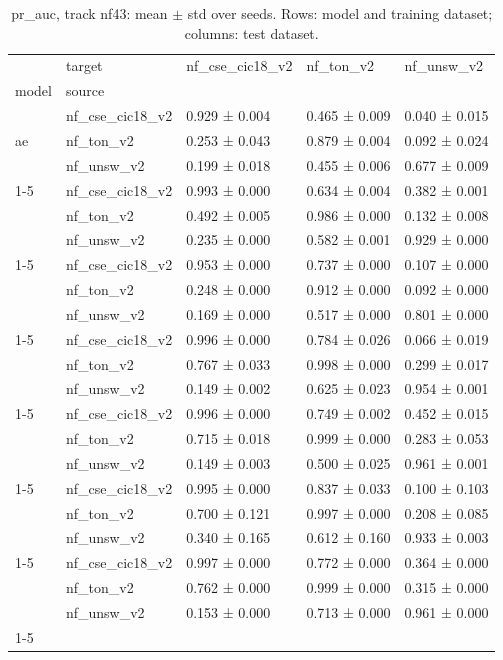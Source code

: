 \begin{table}
\caption{pr_auc, track nf43: mean $\pm$ std over seeds. Rows: model and training dataset; columns: test dataset.}
\label{tab:matrix_nf43_pr_auc}
\begin{tabular}{lllll}
\toprule
 & target & nf_cse_cic18_v2 & nf_ton_v2 & nf_unsw_v2 \\
model & source &  &  &  \\
\midrule
\multirow[t]{3}{*}{ae} & nf_cse_cic18_v2 & 0.929 ± 0.004 & 0.465 ± 0.009 & 0.040 ± 0.015 \\
 & nf_ton_v2 & 0.253 ± 0.043 & 0.879 ± 0.004 & 0.092 ± 0.024 \\
 & nf_unsw_v2 & 0.199 ± 0.018 & 0.455 ± 0.006 & 0.677 ± 0.009 \\
\cline{1-5}
\multirow[t]{3}{*}{dt} & nf_cse_cic18_v2 & 0.993 ± 0.000 & 0.634 ± 0.004 & 0.382 ± 0.001 \\
 & nf_ton_v2 & 0.492 ± 0.005 & 0.986 ± 0.000 & 0.132 ± 0.008 \\
 & nf_unsw_v2 & 0.235 ± 0.000 & 0.582 ± 0.001 & 0.929 ± 0.000 \\
\cline{1-5}
\multirow[t]{3}{*}{lda} & nf_cse_cic18_v2 & 0.953 ± 0.000 & 0.737 ± 0.000 & 0.107 ± 0.000 \\
 & nf_ton_v2 & 0.248 ± 0.000 & 0.912 ± 0.000 & 0.092 ± 0.000 \\
 & nf_unsw_v2 & 0.169 ± 0.000 & 0.517 ± 0.000 & 0.801 ± 0.000 \\
\cline{1-5}
\multirow[t]{3}{*}{mlp} & nf_cse_cic18_v2 & 0.996 ± 0.000 & 0.784 ± 0.026 & 0.066 ± 0.019 \\
 & nf_ton_v2 & 0.767 ± 0.033 & 0.998 ± 0.000 & 0.299 ± 0.017 \\
 & nf_unsw_v2 & 0.149 ± 0.002 & 0.625 ± 0.023 & 0.954 ± 0.001 \\
\cline{1-5}
\multirow[t]{3}{*}{rf} & nf_cse_cic18_v2 & 0.996 ± 0.000 & 0.749 ± 0.002 & 0.452 ± 0.015 \\
 & nf_ton_v2 & 0.715 ± 0.018 & 0.999 ± 0.000 & 0.283 ± 0.053 \\
 & nf_unsw_v2 & 0.149 ± 0.003 & 0.500 ± 0.025 & 0.961 ± 0.001 \\
\cline{1-5}
\multirow[t]{3}{*}{tabnet} & nf_cse_cic18_v2 & 0.995 ± 0.000 & 0.837 ± 0.033 & 0.100 ± 0.103 \\
 & nf_ton_v2 & 0.700 ± 0.121 & 0.997 ± 0.000 & 0.208 ± 0.085 \\
 & nf_unsw_v2 & 0.340 ± 0.165 & 0.612 ± 0.160 & 0.933 ± 0.003 \\
\cline{1-5}
\multirow[t]{3}{*}{xgb} & nf_cse_cic18_v2 & 0.997 ± 0.000 & 0.772 ± 0.000 & 0.364 ± 0.000 \\
 & nf_ton_v2 & 0.762 ± 0.000 & 0.999 ± 0.000 & 0.315 ± 0.000 \\
 & nf_unsw_v2 & 0.153 ± 0.000 & 0.713 ± 0.000 & 0.961 ± 0.000 \\
\cline{1-5}
\bottomrule
\end{tabular}
\end{table}
